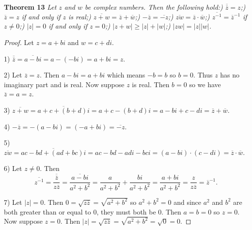 \documentclass{article}
\begin{document}
\begin{flushleft}
\textbf{Theorem 13}
\textsl{Let $z$ and $w$ be complex numbers. Then the following hold:) $\overline{\overline{z}} = z$;) $\overline{z} = z$ if and only if $z$ is real;) $\overline{z+w} = \overline{z} + \overline{w}$;) $-\overline{z} = \overline{-z}$;) $\overline{zw} = \overline{z} \cdot \overline{w}$;) $\overline{z^{-1}} = \overline{z}^{-1}$ if $z \neq 0$;) $|z| = 0$ if and only if $z = 0$;) $|z+w| \geq |z| + |w|$;) $|zw| = |z||w|$.}
\begin{proof}
Let $z = a+bi$ and $w = c+di$.\newline

1) $\overline{\overline{z}} = \overline{a-bi} = a - (-bi) = a+bi = z$.\newline

2) Let $\overline{z} = z$. Then $a-bi = a+bi$ which means $-b = b$ so $b = 0$. Thus $z$ has no imaginary part and is real. Now suppose $z$ is real. Then $b=0$ so we have $\overline{z} = a = z$.\newline

3) $\overline{z+w} = \overline{a+c + (b+d)i} = a+c -(b+d)i = a-bi + c-di = \overline{z} + \overline{w}$.\newline

4) $-\overline{z} = -(a-bi) = (-a + bi) = \overline{-z}$.\newline

5) $\overline{zw} = \overline{ac-bd + (ad + bc)i} = ac-bd-adi-bci = (a-bi) \cdot (c-di) = \overline{z} \cdot \overline{w}$. \newline

6) Let $z \neq 0$. Then
\[
\overline{z^{-1}} = \overline{\frac{\overline{z}}{z \overline{z}}} = \overline{\frac{a-bi}{a^2 + b^2}} = \frac{a}{a^2 + b^2} + \frac{bi}{a^2+b^2} = \frac{a+bi}{a^2 + b^2} = \frac{z}{z \overline{z}} = \overline{z}^{-1}.
\]

7) Let $|z| = 0$. Then $0 = \sqrt{z \overline{z}} = \sqrt{a^2 + b^2}$ so $a^2 + b^2 = 0$ and since $a^2$ and $b^2$ are both greater than or equal to $0$, they must both be $0$. Then $a = b = 0$ so $z = 0$. Now suppose $z = 0$. Then $|z| = \sqrt{z \overline{z}} = \sqrt{a^2 + b^2} = \sqrt{0} = 0$.\newline


\end{proof}
\end{flushleft}
\end{document}
